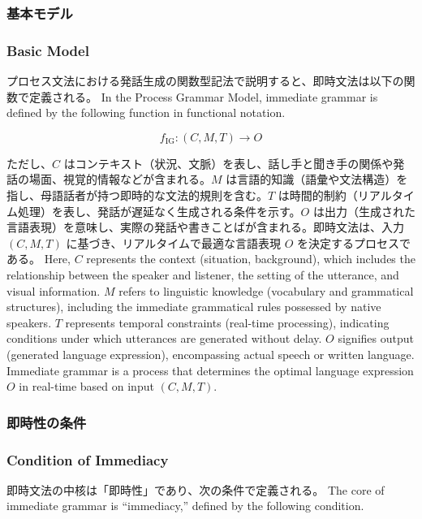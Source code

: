 \documentclass[a4paper,xelatex,ja=standard]{bxjsarticle}
\begin{document}
\ifJPN
\subsubsection{基本モデル}
\else
\subsubsection{Basic Model}

\ifJPN
プロセス文法における発話生成の関数型記法で説明すると、即時文法は以下の関数で定義される。
\else
In the Process Grammar Model, immediate grammar is defined by the following function in functional notation.
\fi

\[
  f_{\text{IG}} : (C, M, T) \to O
\]

\ifJPN
ただし、\( C \) はコンテキスト（状況、文脈）を表し、話し手と聞き手の関係や発話の場面、視覚的情報などが含まれる。\( M \) は言語的知識（語彙や文法構造）を指し、母語話者が持つ即時的な文法的規則を含む。\( T \) は時間的制約（リアルタイム処理）を表し、発話が遅延なく生成される条件を示す。\( O \) は出力（生成された言語表現）を意味し、実際の発話や書きことばが含まれる。即時文法は、入力 \((C, M, T)\) に基づき、リアルタイムで最適な言語表現 \( O \) を決定するプロセスである。
\else
Here, \( C \) represents the context (situation, background), which includes the relationship between the speaker and listener, the setting of the utterance, and visual information. \( M \) refers to linguistic knowledge (vocabulary and grammatical structures), including the immediate grammatical rules possessed by native speakers. \( T \) represents temporal constraints (real-time processing), indicating conditions under which utterances are generated without delay. \( O \) signifies output (generated language expression), encompassing actual speech or written language. Immediate grammar is a process that determines the optimal language expression \( O \) in real-time based on input \((C, M, T)\).
\fi

\ifJPN
\subsubsection{即時性の条件}
\else
  \subsubsection{Condition of Immediacy}
\fi

\ifJPN
即時文法の中核は「即時性」であり、次の条件で定義される。
\else
The core of immediate grammar is ``immediacy,'' defined by the following condition.
\fi
\end{document}
